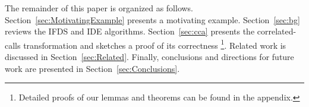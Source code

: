 The remainder of this paper is organized as follows.
%
Section~\ref{sec:MotivatingExample} presents a motivating example.
%
Section~\ref{sec:bg} reviews the IFDS and IDE algorithms.
%
Section~\ref{sec:cca} presents the correlated-calls transformation
and sketches a proof of its correctness%
\footnote{
  Detailed proofs of our lemmas and theorems can be found in
  the appendix.
}.
%
Related work is discussed in Section~\ref{sec:Related}.
%
Finally, conclusions and directions for future work are presented in Section~\ref{sec:Conclusions}.

 
 
